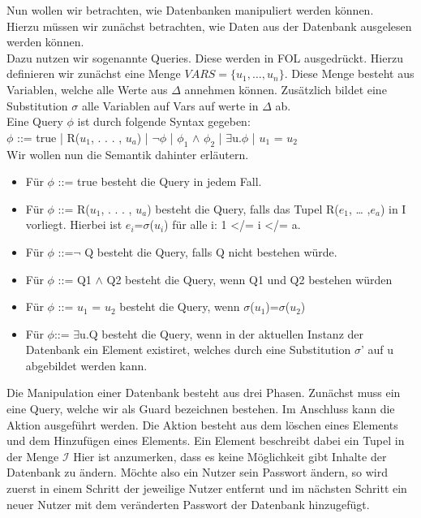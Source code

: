 Nun wollen wir betrachten, wie Datenbanken manipuliert werden können.\\
Hierzu müssen wir zunächst betrachten, wie Daten aus der Datenbank ausgelesen werden können.\\
Dazu nutzen wir sogenannte Queries. Diese werden in FOL ausgedrückt. Hierzu definieren wir zunächst eine Menge $VARS = \{u_1,…,u_n\}$. Diese Menge besteht aus Variablen, welche alle Werte aus ${\Delta}$ annehmen können. Zusätzlich bildet eine Substitution ${\sigma}$ alle Variablen auf Vars auf werte in ${\Delta}$ ab. \\
 Eine Query ${\phi}$ ist durch folgende Syntax gegeben: \\
${\phi}$ ::= true | R($u_1$, . . . , $u_a$) | ${\neg}{\phi}$ | ${\phi}_1$ $\wedge$ ${\phi}_2$ | $\exists$u.${\phi}$ | $u_1$ = $u_2$ \\
Wir wollen nun die Semantik dahinter erläutern.
\begin{itemize}
\item Für ${\phi}$ ::= true besteht die Query in jedem Fall.
\item Für ${\phi}$ ::= R($u_1$, . . . , $u_a$) besteht die Query, falls das Tupel R($e_1$, … ,$e_a$) in I vorliegt. Hierbei ist $e_i$=${\sigma}$($u_i$) für alle i: 1 </= i </= a.
\item Für ${\phi}$ ::=${\neg}$ Q besteht die Query, falls Q nicht bestehen würde. 
\item Für ${\phi}$ ::= Q1 $\wedge$ Q2 besteht die Query, wenn Q1 und Q2  bestehen würden
\item Für ${\phi}$ ::= $u_1$ = $u_2$  besteht die Query, wenn ${\sigma}$($u_1$)=${\sigma}$($u_2$)
\item Für ${\phi}$::= $\exists$u.Q besteht die Query, wenn in der aktuellen Instanz der Datenbank ein Element existiret, welches durch eine Substitution  ${\sigma}$' auf u abgebildet werden kann. 
\end{itemize}
Die Manipulation einer Datenbank besteht aus drei Phasen. Zunächst muss ein eine Query, welche wir als Guard bezeichnen bestehen. Im Anschluss kann die Aktion ausgeführt werden. Die Aktion besteht aus dem löschen eines Elements und dem Hinzufügen eines Elements. Ein Element beschreibt dabei ein Tupel in der Menge $\mathcal{I}$ Hier ist anzumerken, dass es keine Möglichkeit gibt Inhalte der Datenbank zu ändern. Möchte also ein Nutzer sein Passwort ändern, so wird zuerst in einem Schritt der jeweilige Nutzer entfernt und im nächsten Schritt ein neuer Nutzer mit dem veränderten Passwort der Datenbank hinzugefügt.









